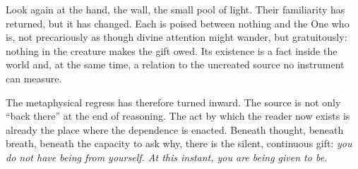 Look again at the hand, the wall, the small pool of light. Their familiarity has returned, but it has changed. Each is poised between nothing and the One who is, not precariously as though divine attention might wander, but gratuitously: nothing in the creature makes the gift owed. Its existence is a fact inside the world and, at the same time, a relation to the uncreated source no instrument can measure.

The metaphysical regress has therefore turned inward. The source is not only ``back there'' at the end of reasoning. The act by which the reader now exists is already the place where the dependence is enacted. Beneath thought, beneath breath, beneath the capacity to ask why, there is the silent, continuous gift: \emph{you do not have being from yourself. At this instant, you are being given to be.}
